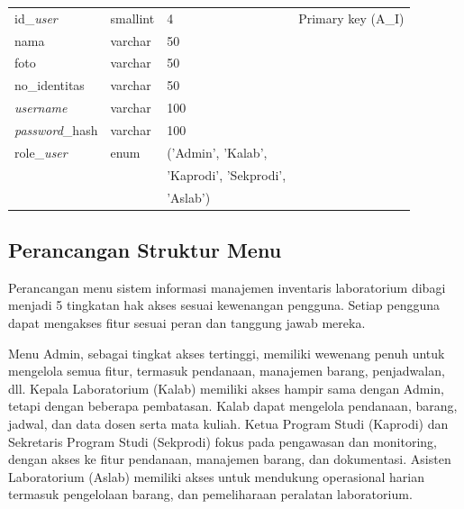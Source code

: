 \begin{enumerate}
{\begin{longtable}{l l l l}
				      id\_\textit{user}       & smallint               & 4                                                  & Primary key (A\_I)    \\
				      nama                    & varchar                & 50                                                 &                       \\
				      foto                    & varchar                & 50                                                 &                       \\
				      no\_identitas           & varchar                & 50                                                 &                       \\
				      \textit{username}       & varchar                & 100                                                &                       \\
				      \textit{password}\_hash & varchar                & 100                                                &                       \\
				      role\_\textit{user}     & enum                   & ('Admin', 'Kalab',                                 &                       \\
				                              &                        & 'Kaprodi', 'Sekprodi',                             &                       \\
				                              &                        & 'Aslab')                                           &                       \\
				      \hline
			      \end{longtable}
		      }

\end{enumerate}

\subsection{Perancangan Struktur Menu}
Perancangan menu sistem informasi manajemen inventaris laboratorium dibagi menjadi 5 tingkatan hak akses sesuai kewenangan pengguna. Setiap pengguna dapat mengakses fitur sesuai peran dan tanggung jawab mereka.

Menu Admin, sebagai tingkat akses tertinggi, memiliki wewenang penuh untuk mengelola semua fitur, termasuk pendanaan, manajemen barang, penjadwalan, dll. Kepala Laboratorium (Kalab) memiliki akses hampir sama dengan Admin, tetapi dengan beberapa pembatasan. Kalab dapat mengelola pendanaan, barang, jadwal, dan data dosen serta mata kuliah. Ketua Program Studi (Kaprodi) dan Sekretaris Program Studi (Sekprodi) fokus pada pengawasan dan monitoring, dengan akses ke fitur pendanaan, manajemen barang, dan dokumentasi. Asisten Laboratorium (Aslab) memiliki akses untuk mendukung operasional harian termasuk pengelolaan barang, dan pemeliharaan peralatan laboratorium.

